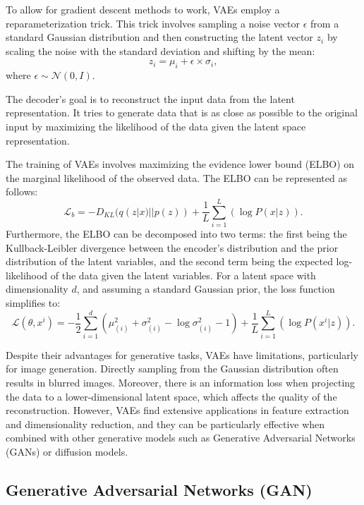 \documentclass[11pt,a4paper,oneside]{report}
\begin{document}
To allow for gradient descent methods to work, VAEs employ a reparameterization trick. This trick involves sampling a noise vector $\epsilon$ from a standard Gaussian distribution and then constructing the latent vector $z_i$ by scaling the noise with the standard deviation and shifting by the mean:
\begin{equation}
z_i = \mu_i + \epsilon \times \sigma_i,
\end{equation}
where $\epsilon \sim \mathcal{N}(0, I)$.

The decoder's goal is to reconstruct the input data from the latent representation. It tries to generate data that is as close as possible to the original input by maximizing the likelihood of the data given the latent space representation.

The training of VAEs involves maximizing the evidence lower bound (ELBO) on the marginal likelihood of the observed data. The ELBO can be represented as follows:
\begin{equation}
\mathcal{L}_b = -D_{KL}(q(z|x)||p(z)) + \frac{1}{L} \sum_{i=1}^{L}(\log P(x|z)).
\end{equation}
Furthermore, the ELBO can be decomposed into two terms: the first being the Kullback-Leibler divergence between the encoder's distribution and the prior distribution of the latent variables, and the second term being the expected log-likelihood of the data given the latent variables. For a latent space with dimensionality $d$, and assuming a standard Gaussian prior, the loss function simplifies to:
\begin{equation}
\mathcal{L}(\theta, x^i) = -\frac{1}{2} \sum_{i=1}^{d} \left( \mu^{2}_{(i)} + \sigma^{2}_{(i)} - \log \sigma^{2}_{(i)} - 1 \right) + \frac{1}{L} \sum_{i=1}^{L} \left( \log P(x^{i} | z) \right).
\end{equation}

Despite their advantages for generative tasks, VAEs have limitations, particularly for image generation. Directly sampling from the Gaussian distribution often results in blurred images. Moreover, there is an information loss when projecting the data to a lower-dimensional latent space, which affects the quality of the reconstruction. However, VAEs find extensive applications in feature extraction and dimensionality reduction, and they can be particularly effective when combined with other generative models such as Generative Adversarial Networks (GANs) or diffusion models.

\subsection{Generative Adversarial Networks (GAN)}
\end{document}
